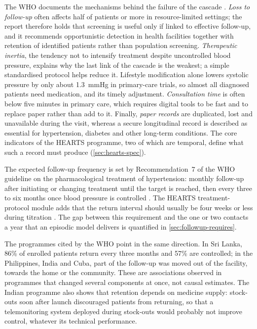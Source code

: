The WHO documents the mechanisms behind the failure of the cascade \parencite{who2023hypertension}. \emph{Loss to follow-up} often affects half of patients or more in resource-limited settings; the report therefore holds that screening is useful only if linked to effective follow-up, and it recommends opportunistic detection in health facilities together with retention of identified patients rather than population screening. \emph{Therapeutic inertia}, the tendency not to intensify treatment despite uncontrolled blood pressure, explains why the last link of the cascade is the weakest; a simple standardised protocol helps reduce it. Lifestyle modification alone lowers systolic pressure by only about 1.3~mmHg in primary-care trials, so almost all diagnosed patients need medication, and its timely adjustment. \emph{Consultation time} is often below five minutes in primary care, which requires digital tools to be fast and to replace paper rather than add to it. Finally, \emph{paper records} are duplicated, lost and unavailable during the visit, whereas a secure longitudinal record is described as essential for hypertension, diabetes and other long-term conditions. The core indicators of the HEARTS programme, two of which are temporal, define what such a record must produce (\cref{sec:hearts-spec}).

The expected follow-up frequency is set by Recommendation~7 of the WHO guideline on the pharmacological treatment of hypertension: monthly follow-up after initiating or changing treatment until the target is reached, then every three to six months once blood pressure is controlled \parencite{who2021guideline}. The HEARTS treatment-protocol module adds that the return interval should usually be four weeks or less during titration \parencite{whoHEARTS}. The gap between this requirement and the one or two contacts a year that an episodic model delivers is quantified in \cref{sec:followup-requires}.

The programmes cited by the WHO point in the same direction. In Sri Lanka, 86\% of enrolled patients return every three months and 57\% are controlled; in the Philippines, India and Cuba, part of the follow-up was moved out of the facility, towards the home or the community. These are associations observed in programmes that changed several components at once, not causal estimates. The Indian programme also shows that retention depends on medicine supply: stock-outs soon after launch discouraged patients from returning, so that a telemonitoring system deployed during stock-outs would probably not improve control, whatever its technical performance.

